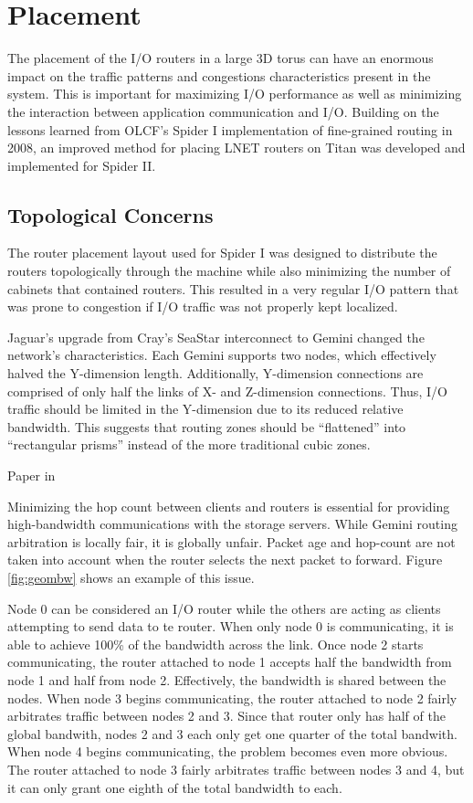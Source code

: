 \section{Placement}

The placement of the I/O routers in a large 3D torus can have an enormous impact
on the traffic patterns and congestions characteristics present in the system.
This is important for maximizing I/O performance as well as minimizing the
interaction between application communication and I/O. Building on the lessons
learned from OLCF's Spider I implementation of fine-grained routing in 2008, an
improved method for placing LNET routers on Titan was developed and implemented
for Spider II.

\subsection{Topological Concerns}

The router placement layout used for Spider I was designed to distribute the
routers topologically through the machine while also minimizing the number of
cabinets that contained routers. This resulted in a very regular I/O pattern
that was prone to congestion if I/O traffic was not properly kept localized.

Jaguar's upgrade from Cray's SeaStar interconnect to Gemini changed the
network's characteristics.  Each Gemini supports two nodes, which effectively
halved the Y-dimension length.  Additionally, Y-dimension connections are
comprised of only half the links of X- and Z-dimension connections.  Thus, I/O
traffic should be limited in the Y-dimension due to its reduced relative
bandwidth. This suggests that routing zones should be ``flattened'' into
``rectangular prisms'' instead of the more traditional cubic zones.

Paper in \cite{interconnect}

Minimizing the hop count between clients and routers is essential for providing
high-bandwidth communications with the storage servers.  While Gemini routing
arbitration is locally fair, it is globally unfair.  Packet age and hop-count
are not taken into account when the router selects the next packet to forward.
Figure \ref{fig:geombw} shows an example of this issue.

Node 0 can be considered an I/O router while the others are acting as clients
attempting to send data to te router.  When only node 0 is communicating, it is
able to achieve 100\% of the bandwidth across the link.  Once node 2 starts
communicating, the router attached to node 1 accepts half the bandwidth from
node 1 and half from node 2.  Effectively, the bandwidth is shared between the
nodes.  When node 3 begins communicating, the router attached to node 2 fairly
arbitrates traffic between nodes 2 and 3.  Since that router only has half of
the global bandwith, nodes 2 and 3 each only get one quarter of the total
bandwith.  When node 4 begins communicating, the problem becomes even more
obvious.  The router attached to node 3 fairly arbitrates traffic between nodes
3 and 4, but it can only grant one eighth of the total bandwidth to each.


